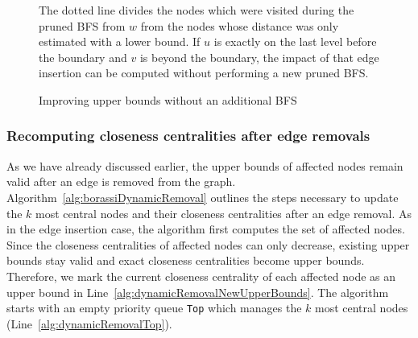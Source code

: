 \begin{figure}[h!]
\centering
{}
\caption{Improving upper bounds without an additional BFS}{The dotted line divides the nodes which were visited during the pruned BFS from $w$ from the nodes whose distance was only estimated with a lower bound. If $u$ is exactly on the last level before the boundary and $v$ is beyond the boundary, the impact of that edge insertion can be computed without performing a new pruned BFS.}
\label{fig:cheapBoundUpdate}
\end{figure}

\FloatBarrier

\subsubsection{Recomputing closeness centralities after edge removals}
\label{sec:dynamicTopClosenessRemoval}
As we have already discussed earlier, the upper bounds of affected nodes remain valid after an edge is removed from the graph. Algorithm~\ref{alg:borassiDynamicRemoval} outlines the steps necessary to update the $k$ most central nodes and their closeness centralities after an edge removal. As in the edge insertion case, the algorithm first computes the set of affected nodes. Since the closeness centralities of affected nodes can only decrease, existing upper bounds stay valid and exact closeness centralities become upper bounds. Therefore, we mark the current closeness centrality of each affected node as an upper bound in Line~\ref{alg:dynamicRemovalNewUpperBounds}. The algorithm starts with an empty priority queue \texttt{Top} which manages the $k$ most central nodes  (Line~\ref{alg:dynamicRemovalTop}).

